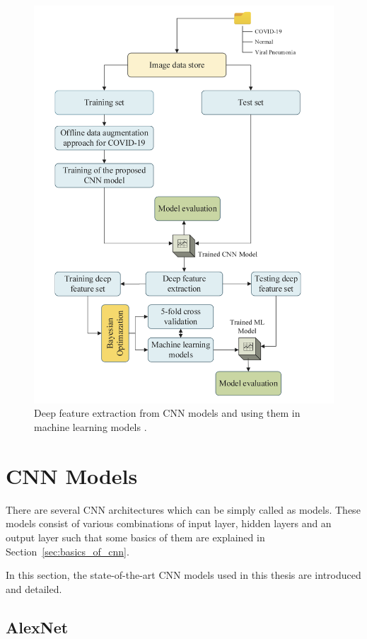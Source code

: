 \begin{figure}[h]
    \centering
    \includegraphics[width=.8\linewidth]{fig/deepfeauter_usage.png}
    \caption{Deep feature extraction from CNN models and using them in machine learning models \cite{A_novelCNNModel}.}
    \label{fig:A_novelCNNModel_architecture}
\end{figure}

\section{CNN Models}

There are several CNN architectures which can be simply called as models. These models consist of various combinations of input layer, hidden layers and an output layer such that some basics of them are explained in Section~\ref{sec:basics_of_cnn}.

In this section, the state-of-the-art CNN models used in this thesis are introduced and detailed.

\subsection{AlexNet}

